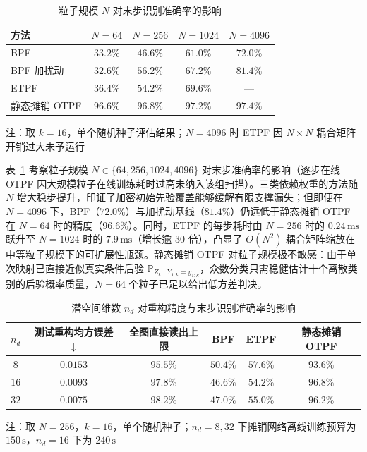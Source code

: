\begin{table}[!htb]
\centering
\caption{粒子规模 $N$ 对末步识别准确率的影响}
\label{cw:tab:ml-particles}
\vspace{0.5em}\wuhao
\begin{tabular}{lcccc}
\toprule[1.5pt]
方法 & $N=64$ & $N=256$ & $N=1024$ & $N=4096$ \\
\midrule[1pt]
BPF & $33.2\%$ & $46.6\%$ & $61.0\%$ & $72.0\%$ \\
BPF 加扰动 & $32.6\%$ & $56.2\%$ & $67.2\%$ & $81.4\%$ \\
ETPF & $36.4\%$ & $54.2\%$ & $69.6\%$ & — \\
静态摊销 OTPF & $\mathbf{96.6\%}$ & $\mathbf{96.8\%}$ & $\mathbf{97.2\%}$ & $\mathbf{97.4\%}$ \\
\bottomrule[1.5pt]
\end{tabular}
\par\vspace{3pt}
{\wuhao 注：取 $k=16$，单个随机种子评估结果；$N=4096$ 时 ETPF 因 $N\times N$ 耦合矩阵开销过大未予运行\par}
\end{table}

表~\ref{cw:tab:ml-particles} 考察粒子规模 $N\in\{64,256,1024,4096\}$ 对末步准确率的影响（逐步在线 OTPF 因大规模粒子在线训练耗时过高未纳入该组扫描）。三类依赖权重的方法随 $N$ 增大稳步提升，印证了加密初始先验覆盖能够缓解有限支撑漏失；但即便在 $N=4096$ 下，BPF（$72.0\%$）与加扰动基线（$81.4\%$）仍远低于静态摊销 OTPF 在 $N=64$ 时的精度（$96.6\%$）。同时，ETPF 的每步耗时由 $N=256$ 时的 $0.24\,\mathrm{ms}$ 跃升至 $N=1024$ 时的 $7.9\,\mathrm{ms}$（增长逾 $30$ 倍），凸显了 $O(N^2)$ 耦合矩阵缩放在中等粒子规模下的可扩展性瓶颈。静态摊销 OTPF 对粒子规模极不敏感：由于单次映射已直接近似真实条件后验 $\mathbb P_{Z_k\mid Y_{1:k}=y_{1:k}}$，众数分类只需稳健估计十个离散类别的后验概率质量，$N=64$ 个粒子已足以给出低方差判决。

\begin{table}[!htb]
\centering
\caption{潜空间维数 $n_d$ 对重构精度与末步识别准确率的影响}
\label{cw:tab:ml-dim}
\vspace{0.5em}\wuhao
\begin{tabular}{cccccc}
\toprule[1.5pt]
$n_d$ & 测试重构均方误差 $\downarrow$ & 全图直接读出上限 & BPF & ETPF & 静态摊销 OTPF \\
\midrule[1pt]
$8$ & $0.0153$ & $95.5\%$ & $50.4\%$ & $57.6\%$ & $\mathbf{93.6\%}$ \\
$16$ & $0.0093$ & $97.8\%$ & $46.6\%$ & $54.2\%$ & $\mathbf{96.8\%}$ \\
$32$ & $0.0075$ & $98.2\%$ & $47.0\%$ & $55.0\%$ & $\mathbf{96.2\%}$ \\
\bottomrule[1.5pt]
\end{tabular}
\par\vspace{3pt}
{\wuhao 注：取 $N=256$，$k=16$，单个随机种子；$n_d=8,32$ 下摊销网络离线训练预算为 $150\,\mathrm{s}$，$n_d=16$ 下为 $240\,\mathrm{s}$\par}
\end{table}

